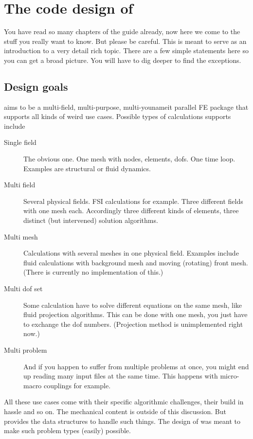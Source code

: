
\chapter{The code design of \baci{}}

You have read so many chapters of the \baci{} guide already, now here we come
to the stuff you really want to know. But please be careful. This is meant to
serve as an introduction to a very detail rich topic. There are a few simple
statements here so you can get a broad picture. You will have to dig deeper to
find the exceptions.

\section{Design goals}

\baci{} aims to be a multi-field, multi-purpose, multi-younameit parallel FE
package that supports all kinds of weird use cases. Possible types of
calculations \baci{} supports include

\begin{description}
\item [Single field] The obvious one. One mesh with nodes, elements, dofs. One
time loop. Examples are structural or fluid dynamics.
\item [Multi field] Several physical fields. FSI calculations for
example. Three different fields with one mesh each. Accordingly three
different kinds of elements, three distinct (but intervened) solution
algorithms. 
\item [Multi mesh] Calculations with several meshes in one physical
field. Examples include fluid calculations with background mesh and moving
(rotating) front mesh. (There is currently no implementation of this.)
\item [Multi dof set] Some calculation have to solve different equations on
the same mesh, like fluid projection algorithms. This can be done with one
mesh, you just have to exchange the dof numbers. (Projection method is
unimplemented right now.)
\item [Multi problem] And if you happen to suffer from multiple problems at
once, you might end up reading many input files at the same time. This happens
with micro-macro couplings for example.
\end{description}

All these use cases come with their specific algorithmic challenges, their
build in hassle and so on. The mechanical content is outside of this
discussion. But \baci{} provides the data structures to handle such
things. The design of \baci{} was meant to make such problem types (easily)
possible.

